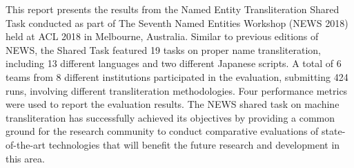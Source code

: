 This report presents the results from the Named Entity Transliteration Shared Task conducted as part of The Seventh Named Entities Workshop (NEWS 2018) held at ACL 2018 in Melbourne, Australia. Similar to previous editions of NEWS, the Shared Task featured 19 tasks on proper name transliteration, including 13 different languages and two different Japanese scripts. A total of 6 teams from 8 different institutions participated in the evaluation, submitting 424 runs, involving different transliteration methodologies. Four performance metrics were used to report the evaluation results. The NEWS shared task on machine transliteration has successfully achieved its objectives by providing a common ground for the research community to conduct comparative evaluations of state-of-the-art technologies that will benefit the future research and development in this area.

